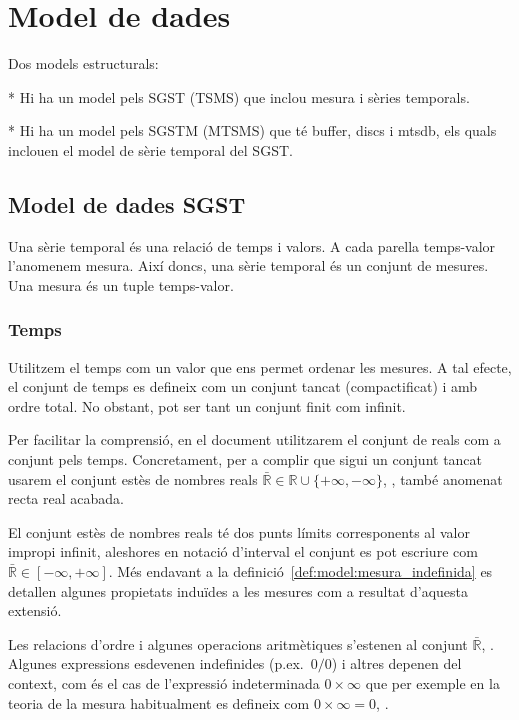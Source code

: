 
\chapter{Model de dades}

Dos models estructurals:

* Hi ha un model pels SGST (TSMS) que inclou mesura i sèries temporals.

* Hi ha un model pels SGSTM (MTSMS) que té buffer, discs i mtsdb, els quals inclouen el model de sèrie temporal del SGST.


\section{Model de dades SGST}

Una sèrie temporal és una relació de temps i valors. A cada parella temps-valor l'anomenem mesura. Així doncs, una sèrie temporal és un conjunt de mesures. Una mesura és un tuple temps-valor.





\subsection{Temps}

Utilitzem el temps com un valor que ens permet ordenar les mesures.  
A tal efecte, el conjunt de temps es defineix com un conjunt tancat (compactificat) i amb ordre total. No obstant, pot ser tant un conjunt finit com infinit. 

Per facilitar la comprensió, en el document utilitzarem el conjunt de reals com a conjunt pels temps. Concretament, per a complir que sigui un conjunt tancat usarem el conjunt estès de nombres reals $\bar{\mathbb{R}} \in \mathbb{R} \cup \{+\infty,-\infty\}$, \parencite{wiki:extendedreal,cantrell:extendedreal}, també anomenat recta real acabada. 


El conjunt estès de nombres reals té dos punts límits corresponents al valor impropi infinit, aleshores en notació d'interval el conjunt es pot escriure com $\bar{\mathbb{R}} \in [-\infty,+\infty]$.  Més endavant a la definició~\ref{def:model:mesura_indefinida} es detallen algunes propietats induïdes a les mesures com a resultat d'aquesta extensió.

Les relacions d'ordre i algunes operacions aritmètiques s'estenen al
conjunt $\bar{\mathbb{R}}$, \cite{cantrell:extendedreal}.  Algunes
expressions esdevenen indefinides (p.ex.\ $0/0$) i altres depenen del
context, com és el cas de l'expressió indeterminada $0 \times \infty$ que
per exemple en la teoria de la mesura habitualment es defineix com $0 \times
\infty = 0$, \cite{wiki:extendedreal}.


